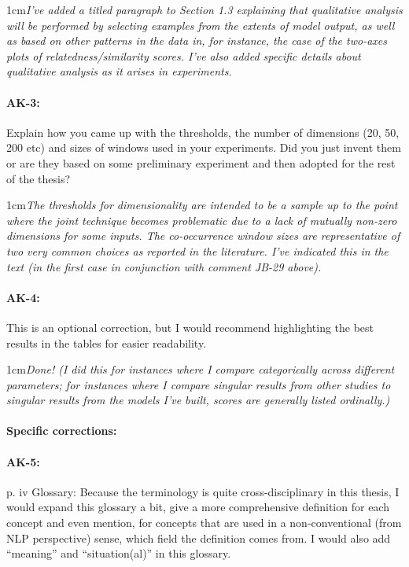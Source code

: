 \documentclass[11pt,a4paper]{article}
\newcommand{\res}[1]{\vspace{0.25cm} \begin{adjustwidth}{1cm}{}\emph{#1}\end{adjustwidth}}
\begin{document}
\res{I've added a titled paragraph to Section 1.3 explaining that qualitative analysis will be performed by selecting examples from the extents of model output, as well as based on other patterns in the data in, for instance, the case of the two-axes plots of relatedness/similarity scores.  I've also added specific details about qualitative analysis as it arises in experiments.}

\paragraph{AK-3:} Explain how you came up with the thresholds, the number of dimensions (20, 50, 200 etc) and sizes of windows used in your experiments. Did you just invent them or are they based on some preliminary experiment and then adopted for the rest of the thesis?

\res{The thresholds for dimensionality are intended to be a sample up to the point where the joint technique becomes problematic due to a lack of mutually non-zero dimensions for some inputs.  The co-occurrence window sizes are representative of two very common choices as reported in the literature.  I've indicated this in the text (in the first case in conjunction with comment JB-29 above).}

\paragraph{AK-4:} This is an optional correction, but I would recommend highlighting the best results in the tables for easier readability.

\res{Done!  (I did this for instances where I compare categorically across different parameters; for instances where I compare singular results from other studies to singular results from the models I've built, scores are generally listed ordinally.)}

\paragraph{Specific corrections:}

\paragraph{AK-5:} p. iv Glossary: Because the terminology is quite cross-disciplinary in this thesis, I would expand this glossary a bit, give a more comprehensive definition for each concept and even mention, for concepts that are used in a non-conventional (from NLP perspective) sense, which field the definition comes from. I would also add ``meaning'' and ``situation(al)'' in this glossary.
\end{document}
